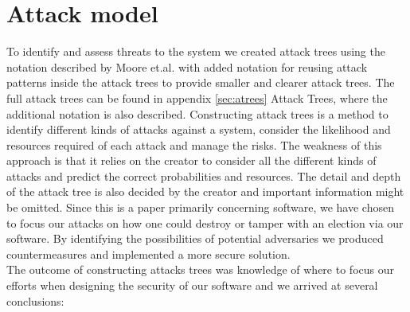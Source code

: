 \documentclass[a4paper]{report}
\begin{document}
\section{Attack model}
To identify and assess threats to the system we created attack trees \cite{schneier} using the notation described by Moore et.al. \cite{moore} with added notation for reusing attack patterns inside the attack trees to provide smaller and clearer attack trees. The full attack trees can be found in appendix \ref{sec:atrees} Attack Trees, where the additional notation is also described. Constructing attack trees is a method to identify different kinds of attacks against a system, consider the likelihood and resources required of each attack and manage the risks. The weakness of this approach is that it relies on the creator to consider all the different kinds of attacks and predict the correct probabilities and resources. The detail and depth of the attack tree is also decided by the creator and important information might be omitted. Since this is a paper primarily concerning software, we have chosen to focus our attacks on how one could destroy or tamper with an election via our software. By identifying the possibilities of potential adversaries we produced countermeasures and implemented a more secure solution. \\

The outcome of constructing attacks trees was knowledge of where to focus our efforts when designing the security of our software and we arrived at several conclusions:
\end{document}

